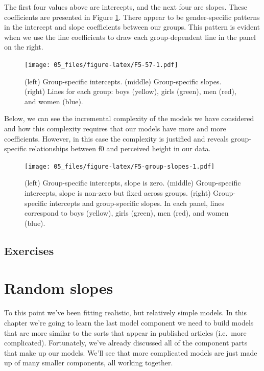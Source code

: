 \documentclass[
]{book}
\begin{document}
The first four values above are intercepts, and the next four are slopes. These coefficients are presented in Figure \ref{fig:F5-57}. There appear to be gender-specific patterns in the intercept and slope coefficients between our groups. This pattern is evident when we use the line coefficients to draw each group-dependent line in the panel on the right.

\begin{figure}
\centering
\texttt{[image: 05\_files/figure-latex/F5-57-1.pdf]}
\caption{\label{fig:F5-57}(left) Group-specific intercepts. (middle) Group-specific slopes. (right) Lines for each group: boys (yellow), girls (green), men (red), and women (blue).}
\end{figure}

Below, we can see the incremental complexity of the models we have considered and how this complexity requires that our models have more and more coefficients. However, in this case the complexity is justified and reveals group-specific relationships between f0 and perceived height in our data.

\begin{figure}
\centering
\texttt{[image: 05\_files/figure-latex/F5-group-slopes-1.pdf]}
\caption{\label{fig:F5-group-slopes}(left) Group-specific intercepts, slope is zero. (middle) Group-specific intercepts, slope is non-zero but fixed across groups. (right) Group-specific intercepts and group-specific slopes. In each panel, lines correspond to boys (yellow), girls (green), men (red), and women (blue).}
\end{figure}

\hypertarget{exercises-4}{%
\section{Exercises}\label{exercises-4}}

\hypertarget{random-slopes}{%
\chapter{Random slopes}\label{random-slopes}}

To this point we've been fitting realistic, but relatively simple models. In this chapter we're going to learn the last model component we need to build models that are more similar to the sorts that appear in published articles (i.e.~more complicated). Fortunately, we've already discussed all of the component parts that make up our models. We'll see that more complicated models are just made up of many smaller components, all working together.
\end{document}
